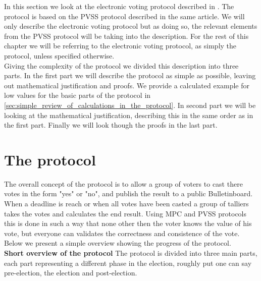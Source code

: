In this section we look at the electronic voting protocol described in \cite{Schoenmakers1999}. The protocol is based on the PVSS protocol described in the same article. We will only describe the electronic voting protocol but as doing so, the relevant elements from the PVSS protocol will be taking into the description. For the rest of this chapter we will be referring to the electronic voting protocol, as simply the protocol, unless specified otherwise. \\

\noindent
Giving the complexity of the protocol we divided this description into three parts. In the first part we will describe the protocol as simple as possible, leaving out mathematical justification and proofs.  We provide a calculated example for low values for the basic parts of the protocol in \ref{sec:simple_review_of_calculations_in_the_protocol}.  In second part we will be looking at the mathematical justification, describing this in the same order as in the first part. Finally we will look though the proofs in the last part. 


\section{The protocol}   \label{sec:the_protocol}


\noindent
The overall concept of the protocol is to allow a group of voters to cast there votes in the form "yes" or "no", and publish the result to a public Bulletinboard. When a deadline is reach or when all votes have been casted a group of talliers takes the votes and calculates the end result. 
Using MPC and PVSS protocols this is done in such a way that none other then the voter knows the value of his vote, but everyone can validates the correctness and consistence of the vote. Below we present a simple overview showing the progress of the protocol. \\

\noindent
\textbf{Short overview of the protocol}
The protocol is divided into three main parts, each part representing a different phase in the election, roughly put one can say pre-election, the election and post-election. 

